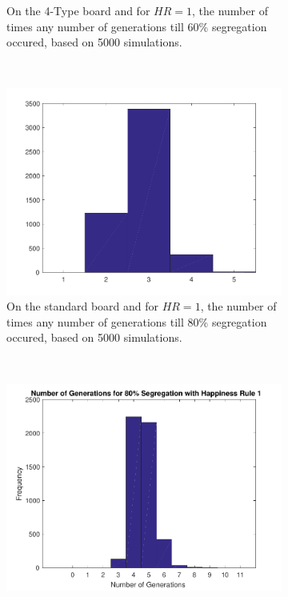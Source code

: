 \begin{figure}[H]
\begin{subfigure}{0.4\textwidth}
    \caption{On the 4-Type board and for $HR=1$, the number of times any number of generations till $60\%$ segregation occured, based on 5000 simulations.}
    \label{fig:segaantgen_460}
\end{subfigure}
~
\begin{subfigure}{0.4\textwidth}
    \centering
    \includegraphics[width=\textwidth]{./60_80_segregation_aantgen/80_segregation.pdf}
    \caption{On the standard board and for $HR=1$, the number of times any number of generations till $80\%$ segregation occured, based on 5000 simulations.}
    \label{fig:segaantgen_s80}
\end{subfigure}
~
\begin{subfigure}{0.4\textwidth}
    \centering
    \includegraphics[width=\textwidth]{./60_80_segregation_aantgen/4TypeBoard/80_segregation.pdf}

\end{subfigure}
\end{figure}
